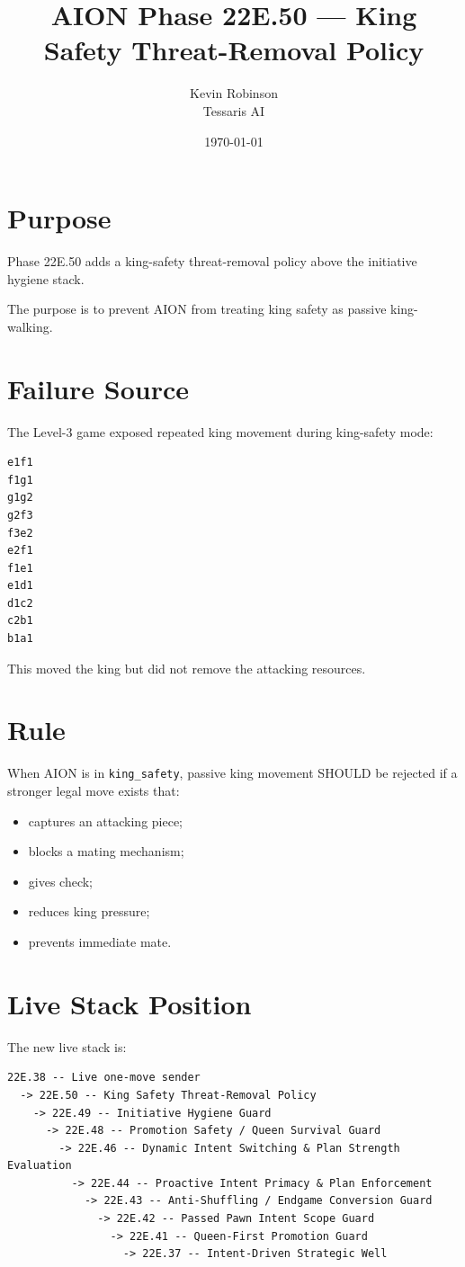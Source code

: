\documentclass[11pt,a4paper]{article}
\title{\textbf{AION Phase 22E.50 --- King Safety Threat-Removal Policy}}
\author{Kevin Robinson\\Tessaris AI}
\date{\today}
\begin{document}
\maketitle

\section{Purpose}

Phase 22E.50 adds a king-safety threat-removal policy above the initiative hygiene stack.

The purpose is to prevent AION from treating king safety as passive king-walking.

\section{Failure Source}

The Level-3 game exposed repeated king movement during king-safety mode:

\begin{verbatim}
e1f1
f1g1
g1g2
g2f3
f3e2
e2f1
f1e1
e1d1
d1c2
c2b1
b1a1
\end{verbatim}

This moved the king but did not remove the attacking resources.

\section{Rule}

When AION is in \texttt{king\_safety}, passive king movement SHOULD be rejected if a stronger legal move exists that:

\begin{itemize}
  \item captures an attacking piece;
  \item blocks a mating mechanism;
  \item gives check;
  \item reduces king pressure;
  \item prevents immediate mate.
\end{itemize}

\section{Live Stack Position}

The new live stack is:

\begin{verbatim}
22E.38 -- Live one-move sender
  -> 22E.50 -- King Safety Threat-Removal Policy
    -> 22E.49 -- Initiative Hygiene Guard
      -> 22E.48 -- Promotion Safety / Queen Survival Guard
        -> 22E.46 -- Dynamic Intent Switching & Plan Strength Evaluation
          -> 22E.44 -- Proactive Intent Primacy & Plan Enforcement
            -> 22E.43 -- Anti-Shuffling / Endgame Conversion Guard
              -> 22E.42 -- Passed Pawn Intent Scope Guard
                -> 22E.41 -- Queen-First Promotion Guard
                  -> 22E.37 -- Intent-Driven Strategic Well
\end{verbatim}
\end{document}
